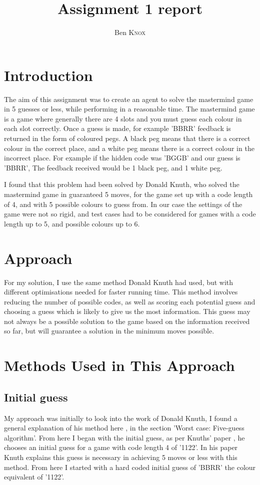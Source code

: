 \documentclass[12pt]{article}
\title{Assignment 1 report}
\author{Ben \textsc{Knox}}
\begin{document}
\maketitle


\section{Introduction}
 
The aim of this assignment was to create an agent to solve the mastermind game in 5 guesses or less, while performing in a reasonable time. The mastermind game is a game where generally there are 4 slots and you must guess each colour in each slot correctly. Once a guess is made, for example 'BBRR' feedback is returned in the form of coloured pegs. A black peg means that there is a correct colour in the correct place, and a white peg means there is a correct colour in the incorrect place. For example if the hidden code was 'BGGB' and our guess is 'BBRR', The feedback received would be 1 black peg, and 1 white peg. 

I found that this problem had been solved by Donald Knuth, who solved the mastermind game in guaranteed 5 moves, for the game set up with a code length of 4, and with 5 possible colours to guess from. In our case the settings of the game were not so rigid, and test cases had to be considered for games with a code length up to 5, and possible colours up to 6.  

\section{Approach}

For my solution, I use the same method Donald Knuth had used, but with different optimisations needed for faster running time. This method involves reducing the number of possible codes, as well as scoring each potential guess and choosing a guess which is likely to give us the most information. This guess may not always be a possible solution to the game based on the information received so far, but will guarantee a solution in the minimum moves possible.

\section{Methods Used in This Approach}
 
\subsection{Initial guess}
My approach was initially to look into the work of Donald Knuth, I found a general explanation of his method here \cite{mastermind wikipedia}, in the section 'Worst case: Five-guess algorithm'. From here I began with the initial guess, as per Knuths' paper \cite{Knuths Paper}, he chooses an initial guess for a game with code length 4 of '1122'. In his paper Knuth explains this guess is necessary in achieving 5 moves or less with this method. From here I started with a hard coded initial guess of 'BBRR' the colour equivalent of '1122'. 
\end{document}
